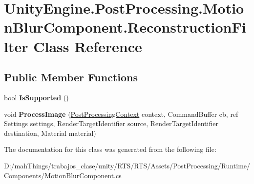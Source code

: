 \hypertarget{class_unity_engine_1_1_post_processing_1_1_motion_blur_component_1_1_reconstruction_filter}{}\section{Unity\+Engine.\+Post\+Processing.\+Motion\+Blur\+Component.\+Reconstruction\+Filter Class Reference}
\label{class_unity_engine_1_1_post_processing_1_1_motion_blur_component_1_1_reconstruction_filter}
\subsection*{Public Member Functions}
\begin{DoxyCompactItemize}
\item 
\mbox{\label{class_unity_engine_1_1_post_processing_1_1_motion_blur_component_1_1_reconstruction_filter_a1ae5385e2ce35105c89b09d668d08cb5}} 
bool {\bfseries Is\+Supported} ()
\item 
\mbox{\label{class_unity_engine_1_1_post_processing_1_1_motion_blur_component_1_1_reconstruction_filter_a10805735f3c20028314f16e0bc6e06b5}} 
void {\bfseries Process\+Image} (\mbox{\hyperlink{class_unity_engine_1_1_post_processing_1_1_post_processing_context}{Post\+Processing\+Context}} context, Command\+Buffer cb, ref Settings settings, Render\+Target\+Identifier source, Render\+Target\+Identifier destination, Material material)
\end{DoxyCompactItemize}


The documentation for this class was generated from the following file\+:\begin{DoxyCompactItemize}
\item 
D\+:/mah\+Things/trabajos\+\_\+clase/unity/\+R\+T\+S/\+R\+T\+S/\+Assets/\+Post\+Processing/\+Runtime/\+Components/Motion\+Blur\+Component.\+cs\end{DoxyCompactItemize}
